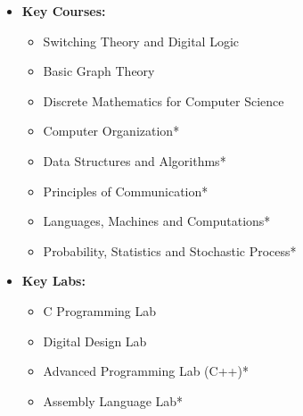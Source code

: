 \documentclass[letterpaper,11pt]{resume}
\begin{document}
\begin{multicols}{2}
{{ \begin{itemize}
    \item{\bf Key Courses:}
     {\begin{itemize}
        \item  {Switching Theory and Digital Logic}
	\item {Basic Graph Theory}
	\item {Discrete Mathematics for Computer Science}
	\item {Computer Organization*}
        \item {Data Structures and Algorithms}*
        \item Principles of Communication*
        \item Languages, Machines and Computations*
        \item Probability, Statistics and Stochastic Process*
      \end{itemize}
      }	
      \end{itemize}
    }
 \begin{itemize}
 \item {\bf Key Labs:}
 {
  \begin{itemize}
    \item {C Programming Lab}
    \item {Digital Design Lab}
    \item Advanced Programming Lab (C++)* \let\thefootnote\relax{} 
    \item Assembly Language Lab* 
  \end{itemize}
 }
\end{itemize}
\vspace{5em}
%    
}
\end{multicols}
\end{document}
